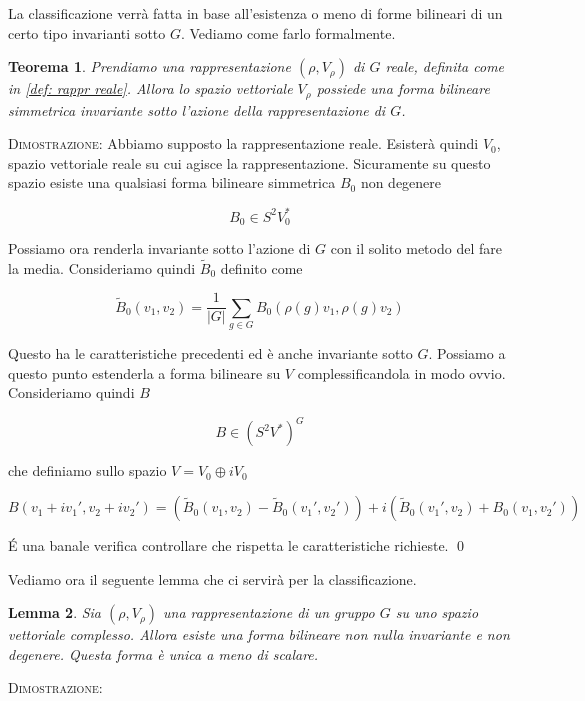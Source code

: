 \documentclass[11pt]{article}
\theoremstyle{plain}
\newtheorem{thm}{Teorema}[section]
\newtheorem{lemma}[thm]{Lemma}
\theoremstyle{definition}
\theoremstyle{remark}
\newcommand{\dsum}{\displaystyle\sum}
\begin{document}
La classificazione verrà fatta in base all'esistenza o meno di forme bilineari di un certo tipo invarianti sotto $G$. Vediamo come farlo formalmente.


\begin{thm}

Prendiamo una rappresentazione $(\rho, V_\rho)$ di $G$ reale, definita come in \ref{def: rappr reale}. Allora lo spazio vettoriale $V_\rho$ possiede una forma bilineare simmetrica invariante sotto l'azione della rappresentazione di $G$.

\end{thm}

\textsc{Dimostrazione:} Abbiamo supposto la rappresentazione reale. Esisterà quindi $V_0$, spazio vettoriale reale su cui agisce la rappresentazione. Sicuramente su questo spazio esiste una qualsiasi forma bilineare simmetrica $B_0$ non degenere

\[ B_0 \in S^2 V_0^*\]

Possiamo ora renderla invariante sotto l'azione di $G$ con il solito metodo del fare la media. Consideriamo quindi $\tilde B_0$ definito come


\[ \tilde B_0(v_1, v_2) = \dfrac{1}{|G|} \dsum_{g\in G} B_0(\rho(g) v_1, \rho(g) v_2)\]




Questo ha le caratteristiche precedenti ed è anche invariante sotto $G$. Possiamo a questo punto estenderla a forma bilineare su $V$ complessificandola in modo ovvio. Consideriamo quindi $B$

\[B \in (S^2V^*)^G \]

che definiamo sullo spazio $V = V_0 \oplus i V_0$ 

\[B(v_1 + i v_1', v_2 + i v_2') = \left( \tilde B_0(v_1, v_2) - \tilde B_0(v_1', v_2')\right)  + i \left( \tilde B_0(v_1', v_2) + B_0(v_1, v_2')\right)\]




\'E una banale verifica controllare che rispetta le caratteristiche richieste.
\qed


Vediamo ora il seguente lemma che ci servirà per la classificazione.

\begin{lemma}
Sia $(\rho, V_\rho)$ una rappresentazione di un gruppo $G$ su uno spazio vettoriale complesso. Allora esiste una forma bilineare non nulla invariante e non degenere. Questa forma è unica a meno di scalare.
\end{lemma}

\textsc{Dimostrazione:}
\end{document}
